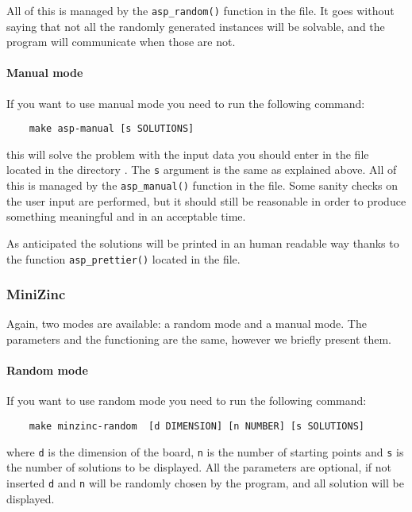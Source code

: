 All of this is managed by the \texttt{asp_random()} function in the  file. 
It goes without saying that not all the randomly generated instances will be solvable, and the program will communicate when those are not.

\paragraph{Manual mode}

If you want to use manual mode you need to run the following command:
\begin{verbatim}
    make asp-manual [s SOLUTIONS]
\end{verbatim}
this will solve the problem with the input data you should enter in the file  located in the directory . The \texttt{s} argument is the same as explained above. All of this is managed by the \texttt{asp_manual()} function in the  file.
Some sanity checks on the user input are performed, but it should still be reasonable in order to produce something meaningful and in an acceptable time.

As anticipated the solutions will be printed in an human readable way thanks to the function \texttt{asp_prettier()} located in the  file.

\subsubsection{MiniZinc}
Again, two modes are available: a random mode and a manual mode. The parameters and the functioning are the same, however we briefly present them.

\paragraph{Random mode}

If you want to use random mode you need to run the following command:
\begin{verbatim}
    make minzinc-random  [d DIMENSION] [n NUMBER] [s SOLUTIONS]
\end{verbatim}
where \texttt{d} is the dimension of the board, \texttt{n} is the number of starting points and \texttt{s} is the number of solutions to be displayed. All the parameters are optional, if not inserted  \texttt{d} and  \texttt{n} will be randomly chosen by the program, and all solution will be displayed.

